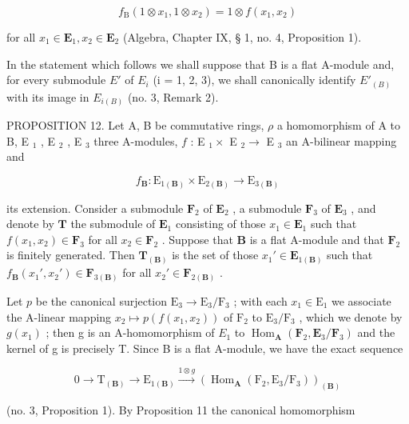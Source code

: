 \[
f _ {\mathrm{B}} (1 \otimes x _ {1}, 1 \otimes x _ {2}) = 1 \otimes f (x _ {1}, x _ {2})
\]

for all \(x_{1} \in \mathbf{E}_{1}, x_{2} \in \mathbf{E}_{2}\) (Algebra, Chapter IX, § 1, no. 4, Proposition 1).

In the statement which follows we shall suppose that B is a flat A-module and, for every submodule \(E'\) of \(E_{i}\) (i = 1, 2, 3), we shall canonically identify \(E'_{(B)}\) with its image in \(E_{i(B)}\) (no. 3, Remark 2).

PROPOSITION 12. Let A, B be commutative rings, \(\rho\) a homomorphism of A to B, E \(_{1}\) , E \(_{2}\) , E \(_{3}\) three A-modules, \(f\) : E \(_{1} \times\) E \(_{2} \to\) E \(_{3}\) an A-bilinear mapping and

\[
f _ {\mathbf {B}} \colon \mathrm{E} _ {1 (\mathbf {B})} \times \mathrm{E} _ {2 (\mathbf {B})} \rightarrow \mathrm{E} _ {3 (\mathbf {B})}
\]

its extension. Consider a submodule \(\mathbf{F}_2\) of \(\mathbf{E}_2\) , a submodule \(\mathbf{F}_3\) of \(\mathbf{E}_3\) , and denote by \(\mathbf{T}\) the submodule of \(\mathbf{E}_1\) consisting of those \(x_1 \in \mathbf{E}_1\) such that \(f(x_1, x_2) \in \mathbf{F}_3\) for all \(x_2 \in \mathbf{F}_2\) . Suppose that \(\mathbf{B}\) is a flat A-module and that \(\mathbf{F}_2\) is finitely generated. Then \(\mathbf{T}_{(\mathbf{B})}\) is the set of those \(x_1' \in \mathbf{E}_{1(\mathbf{B})}\) such that \(f_{\mathbf{B}}(x_1', x_2') \in \mathbf{F}_{3(\mathbf{B})}\) for all \(x_2' \in \mathbf{F}_{2(\mathbf{B})}\) .

Let \(p\) be the canonical surjection \(\mathrm{E}_3 \to \mathrm{E}_3 / \mathrm{F}_3\) ; with each \(x_1 \in \mathrm{E}_1\) we associate the A-linear mapping \(x_2 \mapsto p(f(x_1, x_2))\) of \(\mathrm{F}_2\) to \(\mathrm{E}_3 / \mathrm{F}_3\) , which we denote by \(g(x_{1})\) ; then g is an A-homomorphism of \(E_{1}\) to \(\operatorname{Hom}_{\mathbf{A}}(\mathbf{F}_{2}, \mathbf{E}_{3}/\mathbf{F}_{3})\) and the kernel of g is precisely T. Since B is a flat A-module, we have the exact sequence

\[
0 \longrightarrow \mathrm{T} _ {(\mathbf {B})} \longrightarrow \mathrm{E} _ {1 (\mathbf {B})} \stackrel {1 \otimes g} {\longrightarrow} \left(\operatorname{Hom} _ {\mathbf {A}} \left(\mathrm{F} _ {2}, \mathrm{E} _ {3} / \mathrm{F} _ {3}\right)\right) _ {(\mathbf {B})}
\]

(no. 3, Proposition 1). By Proposition 11 the canonical homomorphism

